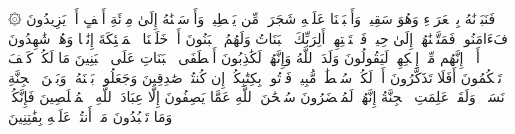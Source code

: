 \startbuffer[\q:37:145]
۞ فَنَبَذۡنَٰهُ بِٱلۡعَرَاۤءِ وَهُوَ سَقِیمࣱ%
\stopbuffer%
\startbuffer[\q:37:146]
وَأَنۢبَتۡنَا عَلَیۡهِ شَجَرَةࣰ مِّن یَقۡطِینࣲ%
\stopbuffer%
\startbuffer[\q:37:147]
وَأَرۡسَلۡنَٰهُ إِلَىٰ مِا۟ئَةِ أَلۡفٍ أَوۡ یَزِیدُونَ%
\stopbuffer%
\startbuffer[\q:37:148]
فَءَامَنُوا۟ فَمَتَّعۡنَٰهُمۡ إِلَىٰ حِینࣲ%
\stopbuffer%
\startbuffer[\q:37:149]
فَٱسۡتَفۡتِهِمۡ أَلِرَبِّكَ ٱلۡبَنَاتُ وَلَهُمُ ٱلۡبَنُونَ%
\stopbuffer%
\startbuffer[\q:37:150]
أَمۡ خَلَقۡنَا ٱلۡمَلَٰۤئِكَةَ إِنَٰثࣰا وَهُمۡ شَٰهِدُونَ%
\stopbuffer%
\startbuffer[\q:37:151]
أَلَاۤ إِنَّهُم مِّنۡ إِفۡكِهِمۡ لَیَقُولُونَ%
\stopbuffer%
\startbuffer[\q:37:152]
وَلَدَ ٱللَّهُ وَإِنَّهُمۡ لَكَٰذِبُونَ%
\stopbuffer%
\startbuffer[\q:37:153]
أَصۡطَفَى ٱلۡبَنَاتِ عَلَى ٱلۡبَنِینَ%
\stopbuffer%
\startbuffer[\q:37:154]
مَا لَكُمۡ كَیۡفَ تَحۡكُمُونَ%
\stopbuffer%
\startbuffer[\q:37:155]
أَفَلَا تَذَكَّرُونَ%
\stopbuffer%
\startbuffer[\q:37:156]
أَمۡ لَكُمۡ سُلۡطَٰنࣱ مُّبِینࣱ%
\stopbuffer%
\startbuffer[\q:37:157]
فَأۡتُوا۟ بِكِتَٰبِكُمۡ إِن كُنتُمۡ صَٰدِقِینَ%
\stopbuffer%
\startbuffer[\q:37:158]
وَجَعَلُوا۟ بَیۡنَهُۥ وَبَیۡنَ ٱلۡجِنَّةِ نَسَبࣰاۚ وَلَقَدۡ عَلِمَتِ ٱلۡجِنَّةُ إِنَّهُمۡ لَمُحۡضَرُونَ%
\stopbuffer%
\startbuffer[\q:37:159]
سُبۡحَٰنَ ٱللَّهِ عَمَّا یَصِفُونَ%
\stopbuffer%
\startbuffer[\q:37:160]
إِلَّا عِبَادَ ٱللَّهِ ٱلۡمُخۡلَصِینَ%
\stopbuffer%
\startbuffer[\q:37:161]
فَإِنَّكُمۡ وَمَا تَعۡبُدُونَ%
\stopbuffer%
\startbuffer[\q:37:162]
مَاۤ أَنتُمۡ عَلَیۡهِ بِفَٰتِنِینَ%
\stopbuffer%
